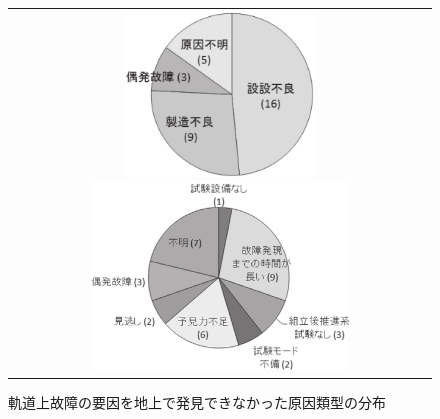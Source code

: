 \documentclass[11pt]{jsreport}
\begin{document}
\begin{figure}[H]
   \centering
      \begin{tabular}{c}
         \begin{minipage}{0.50\hsize}
         \centering
         \includegraphics[width=5cm]{figure/on_orbit_error_tyoe.png}
            \caption{軌道上故障の原因類型の分布\cite{SAITO2011}}
            \label{fig:error type}
         \end{minipage}
         \begin{minipage}{0.50\hsize}
         \centering
         \includegraphics[height=5cm]{figure/not_found_error_seeds.png}
            \caption{軌道上故障の要因を地上で発見できなかった原因類型の分布\cite{SAITO2011}}
            \label{fig:error cause}
         \end{minipage}
      \end{tabular}  
\end{figure}


\end{document}
